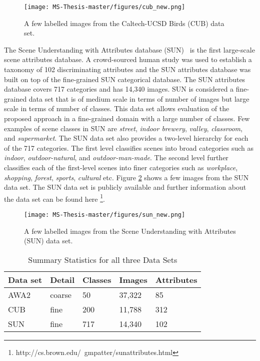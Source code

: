 \begin{figure}[ht]
\centering
\texttt{[image: MS-Thesis-master/figures/cub\_new.png]}
\caption{A few labelled images from the Caltech-UCSD Birds (CUB) data set.}
\label{image:cub}
\end{figure}

The Scene Understanding with Attributes database (SUN)~\cite{sun} is the first large-scale scene attributes database. A crowd-sourced human study was used to establish a taxonomy of 102 discriminating attributes and the SUN attributes database was built on top of the fine-grained SUN categorical database. The SUN attributes database covers 717 categories and has 14,340 images. SUN is considered a fine-grained data set that is of medium scale in terms of number of images but large scale in terms of number of classes. This data set allows evaluation of the proposed approach in a fine-grained domain with a large number of classes. Few examples of scene classes in SUN are \textit{street}, \textit{indoor brewery}, \textit{valley}, \textit{classroom}, and \textit{supermarket}. The SUN data set also provides a two-level hierarchy for each of the 717 categories. The first level classifies scenes into broad categories such as \textit{indoor}, \textit{outdoor-natural}, and \textit{outdoor-man-made}. The second level further classifies each of the first-level scenes into finer categories such as \textit{workplace}, \textit{shopping}, \textit{forest}, \textit{sports}, \textit{cultural} etc. Figure \ref{image:sun} shows a few images from the SUN data set. The SUN data set is publicly available and further information about the data set can be found here 
\footnote{http://cs.brown.edu/~gmpatter/sunattributes.html}.

\bigskip
\bigskip

\begin{figure}[ht]
\centering
\texttt{[image: MS-Thesis-master/figures/sun\_new.png]}
\caption{A few labelled images from the Scene Understanding with Attributes (SUN) data set.}
\label{image:sun}
\end{figure}


\bigskip
\bigskip

\begin{table}[h]
\centering
\caption{Summary Statistics for all three Data Sets}
\begin{tabular}{@{}lllll@{}}
\toprule
\textbf{Data set} & \textbf{Detail} & \textbf{Classes} & \textbf{Images} & \textbf{Attributes} \\ \midrule
AWA2             & coarse          & 50               & 37,322          & 85\\
CUB              & fine            & 200              & 11,788          & 312\\
SUN              & fine            & 717              & 14,340          & 102\\ \bottomrule
\end{tabular}
\label{table:data_stats}
\end{table}